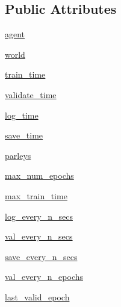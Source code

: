 \subsection*{Public Attributes}
\begin{DoxyCompactItemize}
\item 
\hyperlink{classparlai_1_1scripts_1_1train__model_1_1TrainLoop_a04b7275f3ab548989a48161a7f1b8f3c}{agent}
\item 
\hyperlink{classparlai_1_1scripts_1_1train__model_1_1TrainLoop_aa22c430edd5956591bd0d266f0984ebb}{world}
\item 
\hyperlink{classparlai_1_1scripts_1_1train__model_1_1TrainLoop_a47cce17f07df89709cb9c6579b653920}{train\+\_\+time}
\item 
\hyperlink{classparlai_1_1scripts_1_1train__model_1_1TrainLoop_ac7752245b67836fbcf9469a6247a14a2}{validate\+\_\+time}
\item 
\hyperlink{classparlai_1_1scripts_1_1train__model_1_1TrainLoop_a171257163a989d07a30e0a7077b85f13}{log\+\_\+time}
\item 
\hyperlink{classparlai_1_1scripts_1_1train__model_1_1TrainLoop_abed9a13e3ff9dcdf4b4c1711c0554531}{save\+\_\+time}
\item 
\hyperlink{classparlai_1_1scripts_1_1train__model_1_1TrainLoop_abd0cf79ef34f6ef8f028f7fa44eae971}{parleys}
\item 
\hyperlink{classparlai_1_1scripts_1_1train__model_1_1TrainLoop_a48187974c2f14dcb5c7416709cf750b3}{max\+\_\+num\+\_\+epochs}
\item 
\hyperlink{classparlai_1_1scripts_1_1train__model_1_1TrainLoop_af83e63de91a310e6be11b7570442b191}{max\+\_\+train\+\_\+time}
\item 
\hyperlink{classparlai_1_1scripts_1_1train__model_1_1TrainLoop_a21dfaed0d552564c081077d9f2476a7a}{log\+\_\+every\+\_\+n\+\_\+secs}
\item 
\hyperlink{classparlai_1_1scripts_1_1train__model_1_1TrainLoop_af1b6a637b6bfbc2f47f688b739a9b38d}{val\+\_\+every\+\_\+n\+\_\+secs}
\item 
\hyperlink{classparlai_1_1scripts_1_1train__model_1_1TrainLoop_a1b0c1444a2a2d2550e4f6eea53a435d2}{save\+\_\+every\+\_\+n\+\_\+secs}
\item 
\hyperlink{classparlai_1_1scripts_1_1train__model_1_1TrainLoop_a4600c4ed3161598de0be5de12e220625}{val\+\_\+every\+\_\+n\+\_\+epochs}
\item 
\hyperlink{classparlai_1_1scripts_1_1train__model_1_1TrainLoop_a46ffd685b324d61beb0428afba352664}{last\+\_\+valid\+\_\+epoch}
\item 

\end{DoxyCompactItemize}
